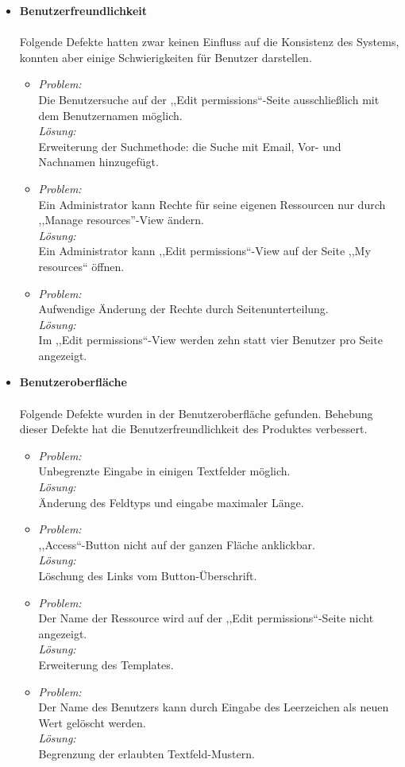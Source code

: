 \documentclass[parskip=full,11pt]{scrartcl}
\begin{document}
\begin{itemize}
\item[] \textbf{Benutzerfreundlichkeit}\\\\
Folgende Defekte hatten zwar keinen Einfluss auf die Konsistenz des Systems, konnten aber einige Schwierigkeiten für Benutzer darstellen.
	\begin{itemize}
		\item \textit{Problem:}\\ Die Benutzersuche auf der ,,Edit permissions``-Seite ausschlie{\ss}lich mit dem Benutzernamen möglich.\\
			\textit{Lösung:} \\Erweiterung der Suchmethode: die Suche mit Email, Vor- und Nachnamen hinzugefügt.
		\item \textit{Problem:}\\ Ein Administrator kann Rechte für seine eigenen Ressourcen nur durch ,,Manage resources''-View ändern.\\
			\textit{Lösung:} \\Ein Administrator kann ,,Edit permissions``-View auf der Seite ,,My resources`` öffnen.
		\item \textit{Problem:}\\ Aufwendige Änderung der Rechte durch Seitenunterteilung.\\
			\textit{Lösung:} \\Im ,,Edit permissions``-View werden zehn statt vier Benutzer pro Seite angezeigt.
	\end{itemize}
	
\item[] \textbf{Benutzeroberfläche}\\\\
Folgende Defekte wurden in der Benutzeroberfläche gefunden. Behebung dieser Defekte hat die Benutzerfreundlichkeit des Produktes verbessert.
	\begin{itemize}
		\item \textit{Problem:}\\ Unbegrenzte Eingabe in einigen Textfelder möglich.\\
			\textit{Lösung:}\\ Änderung des Feldtyps und eingabe maximaler Länge.
		\item \textit{Problem:}\\ ,,Access``-Button nicht auf der ganzen Fläche anklickbar.\\
			\textit{Lösung:}\\ Löschung des Links vom Button-Überschrift.
		\item \textit{Problem:}\\ Der Name der Ressource wird auf der ,,Edit permissions``-Seite nicht angezeigt.\\
			\textit{Lösung:}\\ Erweiterung des Templates.
		\item \textit{Problem:}\\ Der Name des Benutzers kann durch Eingabe des Leerzeichen als neuen Wert gelöscht werden.\\
			\textit{Lösung:}\\ Begrenzung der erlaubten Textfeld-Mustern.
	\end{itemize}
	

\end{itemize}
\end{document}
